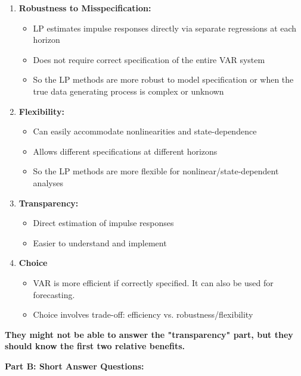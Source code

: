 \begin{enumerate}[leftmargin=*]
    \item \textbf{Robustness to Misspecification:}
    \begin{itemize}
        \item LP estimates impulse responses directly via separate regressions at each horizon
        \item Does not require correct specification of the entire VAR system
        \item So the LP  methods are more robust to model specification or when the true data generating process is complex or unknown
    \end{itemize}
    
    \item \textbf{Flexibility:}
    \begin{itemize}
        \item Can easily accommodate nonlinearities and state-dependence
        \item Allows different specifications at different horizons
        \item So the LP  methods are more flexible for nonlinear/state-dependent analyses
    \end{itemize}
    
    \item \textbf{Transparency:}
    \begin{itemize}
        \item Direct estimation of impulse responses
        \item Easier to understand and implement
    \end{itemize}
    
    \item \textbf{Choice}
   \begin{itemize}
        \item VAR is more efficient if correctly specified. It can also be used for forecasting. 
        \item Choice involves trade-off: efficiency vs. robustness/flexibility
    \end{itemize}
\end{enumerate}

\textbf{They might not be able to answer the "transparency" part, but they should know the first two relative benefits. }
\bigskip


\textbf{\noindent Part B: Short Answer Questions:}






